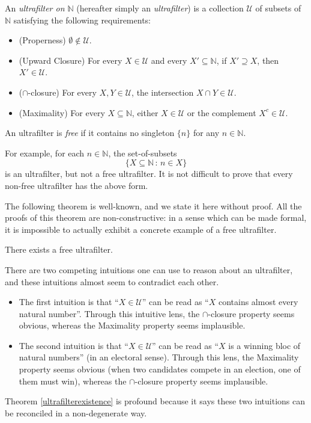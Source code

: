 \documentclass[twoside,11pt]{article}
\begin{document}
\begin{definition}
\label{ultrafilterdefn}
    An \emph{ultrafilter on $\mathbb N$} (hereafter simply an \emph{ultrafilter})
    is a collection $\mathscr U$ of subsets of $\mathbb N$ satisfying the following requirements:
    \begin{itemize}
        \item
            (Properness) $\emptyset\not\in\mathscr U$.
        \item
            (Upward Closure) For every $X\in \mathscr U$ and
            every $X'\subseteq \mathbb N$, if
            $X'\supseteq X$, then $X'\in\mathscr U$.
        \item
            ($\cap$-closure) For every $X,Y\in\mathscr U$, the
            intersection $X\cap Y\in\mathscr U$.
        \item
            (Maximality) For every $X\subseteq \mathbb N$,
            either $X\in\mathscr U$ or the complement
            $X^c\in\mathscr U$.
    \end{itemize}
    An ultrafilter is \emph{free} if it contains no singleton $\{n\}$ for any
    $n\in\mathbb N$.
\end{definition}

For example, for each $n\in\mathbb N$, the set-of-subsets
\[
\{X\subseteq\mathbb N\,:\, n\in X\}
\]
is an ultrafilter, but not a free ultrafilter.
It is not difficult to prove that every non-free ultrafilter has the above form.

The following theorem is well-known, and we state it here without proof.
All the proofs of this theorem are non-constructive: in a sense which can be
made formal, it is impossible to actually exhibit a concrete example of a
free ultrafilter.

\begin{theorem}
\label{ultrafilterexistence}
    There exists a free ultrafilter.
\end{theorem}

There are two competing intuitions one can use to reason about an ultrafilter,
and these intuitions almost seem to contradict each other.
\begin{itemize}
\item
The first intuition is
that ``$X\in\mathscr U$'' can be read as ``$X$ contains almost every natural number''. Through this intuitive lens, the $\cap$-closure property seems
obvious, whereas the Maximality property seems implausible.
\item
The second intuition is that ``$X\in\mathscr U$'' can be read as
``$X$ is a winning bloc of natural numbers'' (in an electoral sense).
Through this lens, the Maximality property seems obvious (when two candidates
compete in an election, one of them must win), whereas the $\cap$-closure property
seems implausible.
\end{itemize}
Theorem \ref{ultrafilterexistence} is profound because it says these two
intuitions can be reconciled in a non-degenerate way.
\end{document}
